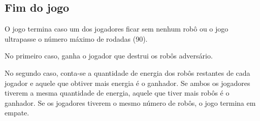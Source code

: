\documentclass[11pt]{article}
\begin{document}
\subsection{Fim do jogo}
O jogo termina caso um dos jogadores ficar sem nenhum robô ou o jogo ultrapasse o número máximo de rodadas (90).

No primeiro caso, ganha o jogador que destrui os robôs adversário.

No segundo caso, conta-se a quantidade de energia dos robôs restantes de cada jogador e aquele que obtiver mais energia é o ganhador. Se ambos os jogadores tiverem a mesma quantidade de energia, aquele que tiver mais robôs é o ganhador. Se os jogadores tiverem o mesmo número de robôs, o jogo termina em empate.
\end{document}
